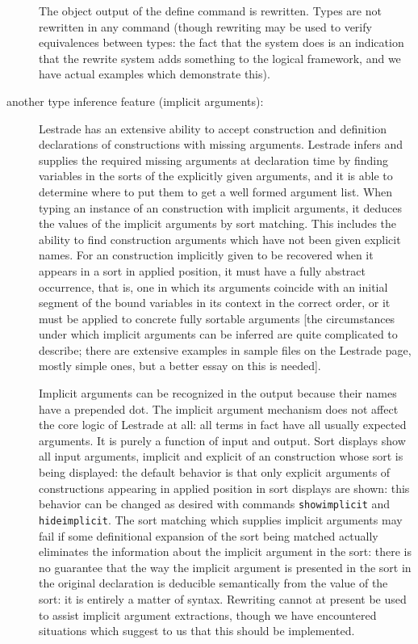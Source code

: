 \documentclass[12pt]{article}
\begin{document}
\begin{description}
The object output of the define command is rewritten.  Types are not rewritten in any command (though rewriting may be used to verify equivalences between types:  the fact that the system does is an indication that the rewrite system adds something to the logical framework, and we have actual examples which demonstrate this).  

\item[another type inference feature (implicit arguments):]   Lestrade has an extensive ability to accept construction and definition declarations of constructions with missing arguments.  Lestrade infers and supplies the required missing arguments at declaration time by finding variables in the sorts of the explicitly given arguments, and it is able to determine where to put them to get a well formed argument list.  When typing an instance of an construction with implicit arguments, it deduces the values of the implicit arguments by sort matching.  This includes the ability to find construction arguments which have not been given explicit names.  For an construction implicitly given to be recovered when it appears in a sort in applied position, it must have a fully abstract occurrence, that is, one in which its arguments coincide with an initial segment of the bound variables in its context in the correct order, or it must be applied to concrete fully sortable arguments [the circumstances under which implicit arguments can be inferred are quite complicated to describe; there are extensive examples in sample files on the Lestrade page, mostly simple ones, but a better essay on this is needed].

Implicit arguments can be recognized in the output because their names have a prepended dot.    The implicit argument mechanism does not affect the core logic of Lestrade at all:
all terms in fact have all usually expected arguments.  It is purely a function of input and output.   Sort displays show all input arguments, implicit and explicit of an construction whose sort is being displayed:  the default behavior is that only explicit arguments of constructions appearing in applied position in sort displays are shown:  this behavior can be changed as desired with commands {\tt showimplicit} and {\tt hideimplicit}.  The sort matching which supplies implicit arguments may fail if some definitional expansion of the sort being matched actually eliminates the information about the implicit argument in the sort:  there is no guarantee that the way the implicit argument is presented in the sort in the original declaration is deducible semantically from the value of the sort:  it is entirely a matter of syntax.   Rewriting cannot at present be used to assist implicit argument extractions, though we have encountered situations which suggest to us that this should be implemented.


\end{description}
\end{document}
